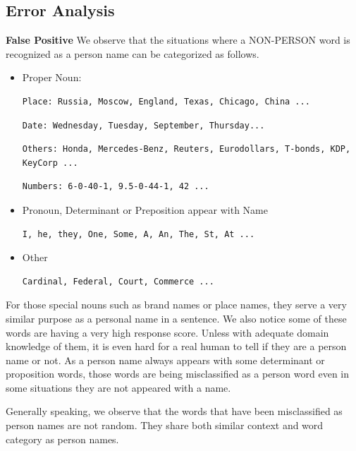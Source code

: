\documentclass[letterpaper]{article}
\begin{document}
\subsection{Error Analysis}

\textbf{False Positive} We observe that the situations where a NON-PERSON word is recognized as a person name can be categorized as follows.
\begin{itemize}
\item Proper Noun:
\begin{verbatim}
Place: Russia, Moscow, England, Texas, Chicago, China ...
\end{verbatim}
\begin{verbatim}
Date: Wednesday, Tuesday, September, Thursday...
\end{verbatim}
\begin{verbatim}
Others: Honda, Mercedes-Benz, Reuters, Eurodollars, T-bonds, KDP, KeyCorp ...
\end{verbatim}
\begin{verbatim}
Numbers: 6-0-40-1, 9.5-0-44-1, 42 ...
\end{verbatim}
\item Pronoun, Determinant or Preposition appear with Name
\begin{verbatim}
I, he, they, One, Some, A, An, The, St, At ...
\end{verbatim}
\item Other
\begin{verbatim}
Cardinal, Federal, Court, Commerce ...
\end{verbatim}
\end{itemize}
For those special nouns such as brand names or place names, they serve a very similar purpose as a personal name in a sentence. We also notice some of these words are having a very high response score. Unless with adequate domain knowledge of them, it is even hard for a real human to tell if they are a person name or not. As a person name always appears with some determinant or proposition words, those words are being misclassified as a person word even in some situations they are not appeared with a name. 

\vspace{0.1cm}

Generally speaking, we observe that the words that have been misclassified as person names are not random. They share both similar context and word category as person names.

\vspace{0.1cm}
\end{document}

